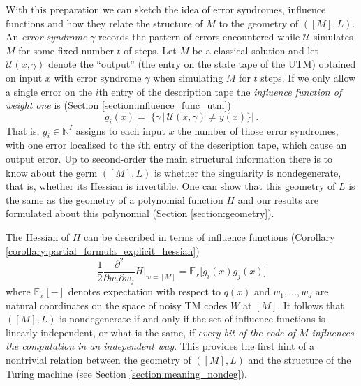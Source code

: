\documentclass[english,letter paper,12pt,reqno]{article}
\theoremstyle{definition}
\def\l{\,|\,}
\begin{document}
With this preparation we can sketch the idea of error syndromes, influence functions and how they relate the structure of $M$ to the geometry of $([M], L)$. An \emph{error syndrome} $\gamma$ records the pattern of errors encountered while $\mathcal{U}$ simulates $M$ for some fixed number $t$ of steps. Let $M$ be a classical solution and let $\mathcal{U}(x, \gamma)$ denote the ``output'' (the entry on the state tape of the UTM) obtained on input $x$ with error syndrome $\gamma$ when simulating $M$ for $t$ steps. If we only allow a single error on the $i$th entry of the description tape the \emph{influence function of weight one} is (Section \ref{section:influence_func_utm})
\begin{equation}
g_i(x) = \Big| \big\{ \gamma \l \mathcal{U}(x,\gamma) \neq y(x) \big\} \Big|\,.
\end{equation}
That is, $g_i \in \mathbb{N}^I$ assigns to each input $x$ the number of those error syndromes, with one error localised to the $i$th entry of the description tape, which cause an output error. Up to second-order the main structural information there is to know about the germ $([M], L)$ is whether the singularity is nondegenerate, that is, whether its Hessian is invertible. One can show that this geometry of $L$ is the same as the geometry of a polynomial function $H$ and our results are formulated about this polynomial (Section \ref{section:geometry}).

The Hessian of $H$ can be described in terms of influence functions (Corollary \ref{corollary:partial_formula_explicit_hessian})
\begin{equation}\label{eq:intro_hessian_H}
\frac{1}{2} \frac{\partial^2}{ \partial w_i \partial w_j} H \Bigr|_{w = [M]} = \mathbb{E}_x\Big[ g_i(x) g_j(x) \Big]
\end{equation}
where $\mathbb{E}_x[-]$ denotes expectation with respect to $q(x)$ and $w_1,\ldots,w_d$ are natural coordinates on the space of noisy TM codes $W$ at $[M]$. It follows that $([M], L)$ is nondegenerate if and only if the set of influence functions is linearly independent, or what is the same, if \emph{every bit of the code of $M$ influences the computation in an independent way}. This provides the first hint of a nontrivial relation between the geometry of $([M], L)$ and the structure of the Turing machine (see Section \ref{section:meaning_nondeg}).
\end{document}
